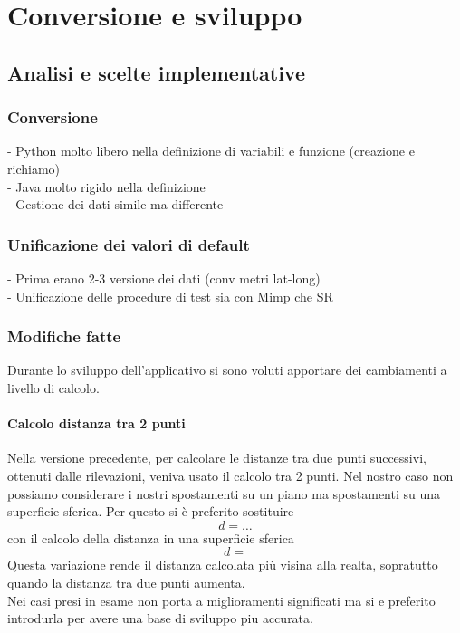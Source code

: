 \chapter{Conversione e sviluppo}

\section{Analisi e scelte implementative}
\subsection{Conversione}
- Python molto libero nella definizione di variabili e funzione (creazione e richiamo)\\
- Java molto rigido nella definizione\\
- Gestione dei dati simile ma differente\\

\subsection{Unificazione dei valori di default}
- Prima erano 2-3 versione dei dati (conv metri lat-long)\\
- Unificazione delle procedure di test sia con Mimp che SR\\


\subsection{Modifiche fatte}
Durante lo sviluppo dell'applicativo si sono voluti apportare dei cambiamenti
a livello di calcolo.
\subsubsection{Calcolo distanza tra 2 punti}
Nella versione precedente, per calcolare le distanze tra due punti successivi,
ottenuti dalle rilevazioni, veniva usato il calcolo tra 2 punti. Nel nostro caso
non possiamo considerare i nostri spostamenti su un piano ma spostamenti su una
superficie sferica. Per questo si è preferito sostituire
\begin{equation}
d =    \dots
\end{equation}
con il calcolo della distanza in una superficie sferica
\begin{equation}
d =
\end{equation}
Questa variazione rende il distanza calcolata più visina alla realta, sopratutto
quando la distanza tra due punti aumenta.\\
Nei casi presi in esame non porta a miglioramenti significati ma si e preferito
introdurla per avere una base di sviluppo piu accurata.

